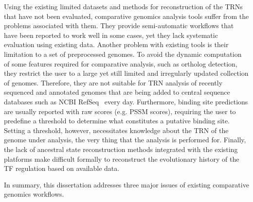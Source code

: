 Using the existing limited datasets and methods for reconstruction of the TRNs
that have not been evaluated, comparative genomics analysis tools suffer from
the problems associated with them. They provide semi-automatic workflows that
have been reported to work well in some cases, yet they lack systematic
evaluation using existing data. Another problem with existing tools is their
limitation to a set of preprocessed genomes. To avoid the dynamic computation
of some features required for comparative analysis, such as ortholog detection,
they restrict the user to a large yet still limited and irregularly updated
collection of genomes. Therefore, they are not suitable for TRN analysis of
recently sequenced and annotated genomes that are being added to central
sequence databases such as NCBI RefSeq~\cite{o2015reference} every
day. Furthermore, binding site predictions are usually reported with raw scores
(e.g. PSSM scores), requiring the user to predefine a threshold to determine
what constitutes a putative binding site. Setting a threshold, however,
necessitates knowledge about the TRN of the genome under analysis, the very
thing that the analysis is performed for. Finally, the lack of ancestral state
reconstruction methods integrated with the existing platforms make difficult
formally to reconstruct the evolutionary history of the TF regulation based on
available data.

In summary, this dissertation addresses three major issues of existing
comparative genomics workflows.

